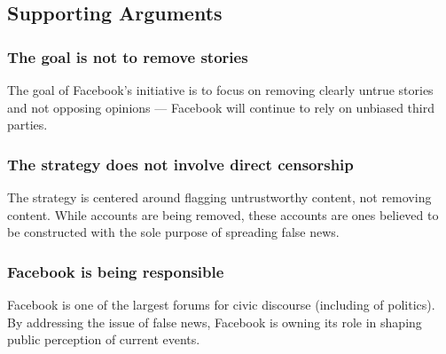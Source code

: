\subsection{Supporting Arguments}

\subsubsection{The goal is not to remove stories}

\par The goal of Facebook's initiative is to focus on removing clearly untrue stories and not opposing opinions --- Facebook will continue to rely on unbiased third parties. \cite{tc_downranks}

\subsubsection{The strategy does not involve direct censorship}

\par The strategy is centered around flagging untrustworthy content, not removing content. While accounts are being removed, these accounts are ones believed to be constructed with the sole purpose of spreading false news. \cite{tc_downranks}

\subsubsection{Facebook is being responsible}

\par Facebook is one of the largest forums for civic discourse (including of politics). By addressing the issue of false news, Facebook is owning its role in shaping public perception of current events. \cite{cnn_fight}

%
\vfill